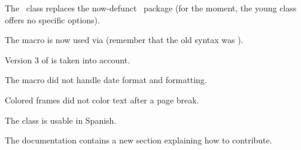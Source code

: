 \documentclass[12pt, a4paper]{article}
\begin{document}
\small

\begin{tdocbreak}
	\item The \thisproj\ class replaces the now-defunct \thisproj\ package (for the moment, the young class offers no specific options).

	\item The  macro is now used via  (remember that the old syntax was ).
\end{tdocbreak}


\begin{tdocfix}
	\item Version 3 of  is taken into account.

	\item The  macro did not handle date format and formatting.

	\item Colored frames did not color text after a page break.
\end{tdocfix}


\begin{tdocnew}
	\item The class is usable in Spanish.

	\item The documentation contains a new section explaining how to contribute.
\end{tdocnew}
\end{document}
